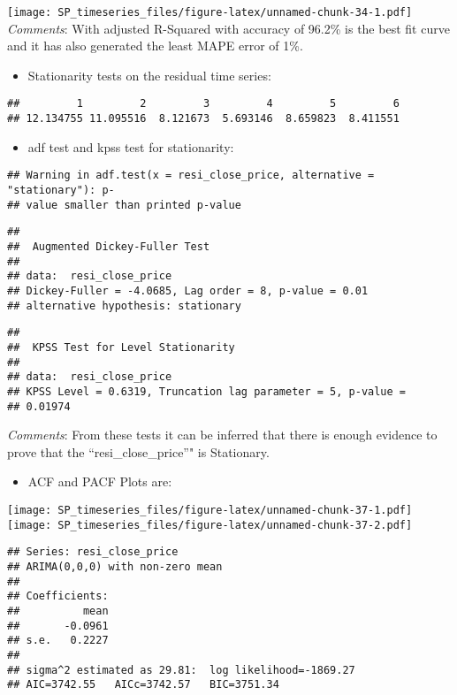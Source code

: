 \documentclass[]{article}
\providecommand{\tightlist}{%
  \setlength{\itemsep}{0pt}\setlength{\parskip}{0pt}}
\begin{document}
\texttt{[image: SP\_timeseries\_files/figure-latex/unnamed-chunk-34-1.pdf]}
\emph{Comments}: With adjusted R-Squared with accuracy of 96.2\% is the
best fit curve and it has also generated the least MAPE error of 1\%.

\begin{itemize}
\tightlist
\item
  Stationarity tests on the residual time series:
\end{itemize}

\begin{verbatim}
##         1         2         3         4         5         6 
## 12.134755 11.095516  8.121673  5.693146  8.659823  8.411551
\end{verbatim}

\begin{itemize}
\tightlist
\item
  adf test and kpss test for stationarity:
\end{itemize}

\begin{verbatim}
## Warning in adf.test(x = resi_close_price, alternative = "stationary"): p-
## value smaller than printed p-value
\end{verbatim}

\begin{verbatim}
## 
##  Augmented Dickey-Fuller Test
## 
## data:  resi_close_price
## Dickey-Fuller = -4.0685, Lag order = 8, p-value = 0.01
## alternative hypothesis: stationary
\end{verbatim}

\begin{verbatim}
## 
##  KPSS Test for Level Stationarity
## 
## data:  resi_close_price
## KPSS Level = 0.6319, Truncation lag parameter = 5, p-value =
## 0.01974
\end{verbatim}

\emph{Comments}: From these tests it can be inferred that there is
enough evidence to prove that the ``resi\_close\_price''" is Stationary.

\begin{itemize}
\tightlist
\item
  ACF and PACF Plots are:
\end{itemize}

\texttt{[image: SP\_timeseries\_files/figure-latex/unnamed-chunk-37-1.pdf]}
\texttt{[image: SP\_timeseries\_files/figure-latex/unnamed-chunk-37-2.pdf]}

\begin{verbatim}
## Series: resi_close_price 
## ARIMA(0,0,0) with non-zero mean 
## 
## Coefficients:
##          mean
##       -0.0961
## s.e.   0.2227
## 
## sigma^2 estimated as 29.81:  log likelihood=-1869.27
## AIC=3742.55   AICc=3742.57   BIC=3751.34
\end{verbatim}
\end{document}
